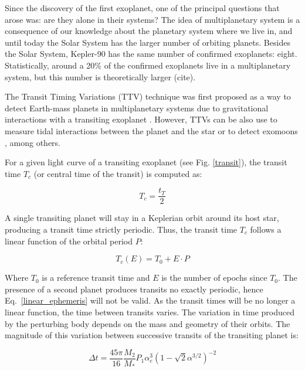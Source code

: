 Since the discovery of the first exoplanet, one of the principal questions that arose was: are they alone in their systems? The idea of multiplanetary system is a consequence of our knowledge about the planetary system where we live in, and until today the Solar System has the larger number of orbiting planets. Besides the Solar System, Kepler-90 has the same number of confirmed exoplanets: eight. Statistically, around a 20\% of the confirmed exoplanets live in a multiplanetary system, but this number is theoretically larger (cite). 

The Transit Timing Variations (TTV) technique was first proposed as a way to detect Earth-mass planets in multiplanetary systems due to gravitational interactions with a transiting exoplanet \citep{Holman2005,Agol2005}. However, TTVs can be also use to measure tidal interactions between the planet and the star or to detect exomoons \citep{Kipping2009a,Kipping2009b}, among others. 

For a given light curve of a transiting exoplanet (see Fig. \ref{transit}), the transit time $T_{c}$ (or central time of the transit) is computed as:

\begin{equation}
T_{c} = \frac{t_T}{2}
\end{equation}

A single transiting planet will stay in a Keplerian orbit around its host star, producing a transit time strictly periodic. Thus, the transit time $T_c$ follows a linear function of the orbital period $P$: 

\begin{equation}
T_{c}(E) = T_{0} + E \cdot P
\label{linear_ephemeris} 
\end{equation}

Where $T_0$ is a reference transit time and $E$ is the number of epochs since $T_0$.  The presence of a second planet produces transits no exactly periodic, hence Eq.~\ref{linear_ephemeris} will not be valid. As the transit times will be no longer a linear function,  the time between  transits varies.  The variation in time produced by the perturbing body depends on the mass and geometry of their orbits. The magnitude of this variation between successive transits of the transiting planet is:

\begin{equation}
\Delta t = \frac{45\pi}{16} \frac{M_2}{M_*} P_{1} \alpha^3_{e} (1-	\sqrt{2}\alpha^{3/2})^{-2}
\label{delta_t}
\end{equation}

